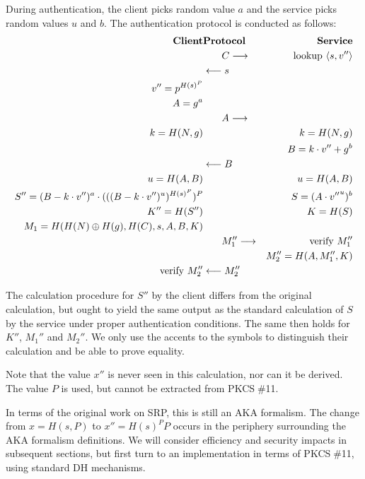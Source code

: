 \documentclass[a4paper,11pt]{article}
\def\pkcs11{PKCS$\;$\#11\xspace}
\def\tol#1{\longleftarrow\strut{}#1\strut\phantom{\longrightarrow}}
\def\tor#1{\phantom{\longleftarrow\strut}#1\strut\longrightarrow}
\begin{document}
During authentication, the client picks random value $a$ and the service picks random values $u$ and $b$.  The authentication protocol is conducted as follows:
%
\begin{eqnarray*}
\textbf{Client}&\textbf{Protocol}&\textbf{Service}\\
&\tor{C}&\textrm{lookup $\langle s,v''\rangle$}\\
&\tol{s}&\\
v''=p^{{H(s)}^P}&&\\
A=g^a&&\\
&\tor{A}&\\
k=H(N,g)&&k=H(N,g)\\
&&B=k\cdot v''+g^b\\
&\tol{B}&\\
u=H(A,B)&&u=H(A,B)\\
S''=(B-k\cdot v'')^a\cdot (((B-k\cdot v'')^u)^{{H(s)}^P})^P && S=(A\cdot {v''}^u)^b\\
K''=H(S'')&&K=H(S)\\
M_1=H(H(N)\oplus H(g),H(C),s,A,B,K)&&\\
&\tor{M_1''}&\textrm{verify $M_1''$}\\
&&M_2''=H(A,M_1'',K)\\
\textrm{verify $M_2''$}&\tol{M_2''}&
\end{eqnarray*}

The calculation procedure for $S''$ by the client differs from the original calculation, but ought to yield the same output as the standard calculation of $S$ by the service under proper authentication conditions.  The same then holds for $K''$, $M_1''$ and $M_2''$.  We only use the accents to the symbols to distinguish their calculation and be able to prove equality.

Note that the value $x''$ is never seen in this calculation, nor can it be derived.  The value $P$ is used, but cannot be extracted from \pkcs11.

In terms of the original work on SRP, this is still an AKA formalism.  The change from $x=H(s,P)$ to $x''={H(s)}^P P$ occurs in the periphery surrounding the AKA formalism definitions.  We will consider efficiency and security impacts in subsequent sections, but first turn to an implementation in terms of \pkcs11, using standard DH mechanisms.
\end{document}
